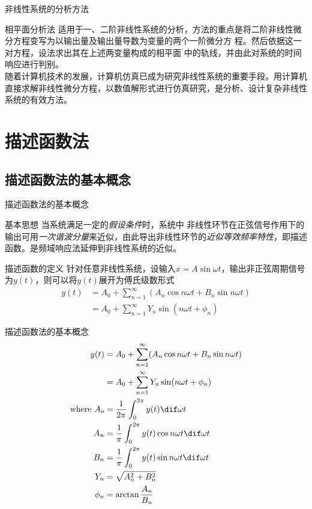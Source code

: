 \documentclass[handout,cjkutf8,table,aspectratio=1610]{beamer} %
\begin{document}
\begin{frame}{非线性系统的分析方法}
	\begin{block}{相平面分析法}
		适用于一、二阶非线性系统的分析，方法的重点是将二阶非线性微分方程变写为以输出量及输出量导数为变量的两个一阶微分方 程。然后依据这一对方程，设法求出其在上述两变量构成的相平面 中的轨线，并由此对系统的时间响应进行判别。\\
		随着计算机技术的发展，计算机仿真已成为研究非线性系统的重要手段。用计算机直接求解非线性微分方程，以数值解形式进行仿真研究，是分析、设计复杂非线性系统的有效方法。
	\end{block}
\end{frame}

\section{描述函数法}
\subsection{描述函数法的基本概念}
\begin{frame}{描述函数法的基本概念}
	\begin{block}{基本思想}
		当系统满足一定的\emph{假设条件}时，系统中 非线性环节在正弦信号作用下的输出可用\emph{一次谐波分量}来近似，由此导出非线性环节的\emph{近似等效频率特性}，即描述函数。是频域响应法延伸到非线性系统的近似。
	\end{block}
	\begin{block}{描述函数的定义\quad{}}
		针对任意非线性系统，设输入$x=A\sin\omega t$，输出非正弦周期信号为$y(t)$，则可以将$y(t)$展开为傅氏级数形式
		\begin{align*}
			y(t)	&= A_0 + \sum_{n=1}^\infty (A_n\cos n\omega t + B_n\sin n\omega t)\\
				&= A_0+\sum_{n=1}^\infty Y_n\sin(n\omega t+\phi_n)
		\end{align*}
	\end{block}
\end{frame}

\begin{frame}{描述函数法的基本概念}\vs{-1em}
	\begin{align*}
		y(t)	&= A_0 + \sum_{n=1}^\infty (A_n\cos n\omega t + B_n\sin n\omega t)\\
			&= A_0+\sum_{n=1}^\infty Y_n\sin(n\omega t+\phi_n)\\
		\text{where }A_o	&= \frac{1}{2\pi}\int_0^{2\pi}y(t)\dif\omega t\\
		A_n	&= \frac{1}{\pi}\int_0^{2\pi}y(t)\cos n\omega t\dif\omega t\\
		B_n	&= \frac{1}{\pi}\int_0^{2\pi}y(t)\sin n\omega t\dif\omega t\\
		Y_n	&= \sqrt{A_n^2+B_n^2}\\
		\phi_n&=\arctan\frac{A_n}{B_n}
	\end{align*}
\end{frame}
\end{document}
